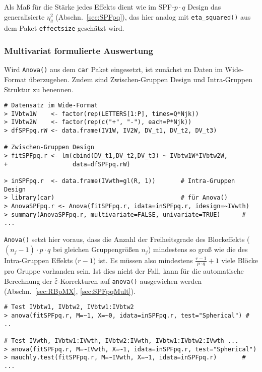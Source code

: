 Als Maß für die Stärke jedes Effekts dient wie im SPF-$p \cdot q$ Design das generalisierte $\eta_{g}^{2}$ (Abschn.\ \ref{sec:SPFpq}), das hier analog mit \lstinline!eta_squared()! aus dem Paket \lstinline!effectsize! geschätzt wird.

\subsubsection{Multivariat formulierte Auswertung}

Wird \lstinline!Anova()! aus dem \lstinline!car! Paket eingesetzt, ist zunächst zu Daten im Wide-Format überzugehen. Zudem sind Zwischen-Gruppen Design und Intra-Gruppen Struktur zu benennen.
\begin{lstlisting}
# Datensatz im Wide-Format
> IVbtw1W    <- factor(rep(LETTERS[1:P], times=Q*Njk))
> IVbtw2W    <- factor(rep(c("+", "-"), each=P*Njk))
> dfSPFpq.rW <- data.frame(IV1W, IV2W, DV_t1, DV_t2, DV_t3)

# Zwischen-Gruppen Design
> fitSPFpq.r <- lm(cbind(DV_t1,DV_t2,DV_t3) ~ IVbtw1W*IVbtw2W,
+                  data=dfSPFpq.rW)

> inSPFpq.r  <- data.frame(IVwth=gl(R, 1))       # Intra-Gruppen Design
> library(car)                                   # für Anova()
> AnovaSPFpq.r <- Anova(fitSPFpq.r, idata=inSPFpq.r, idesign=~IVwth)
> summary(AnovaSPFpq.r, multivariate=FALSE, univariate=TRUE)      # ...
\end{lstlisting}

\lstinline!Anova()! setzt hier voraus, dass die Anzahl der Freiheitsgrade des Blockeffekts ($(n_{j}-1) \cdot p \cdot q$ bei gleichen Gruppengrößen $n_{j}$) mindestens so groß wie die des Intra-Gruppen Effekts ($r-1$) ist. Es müssen also mindestens $\frac{r-1}{p \cdot q} + 1$ viele Blöcke pro Gruppe vorhanden sein. Ist dies nicht der Fall, kann für die automatische Berechnung der $\hat{\varepsilon}$-Korrekturen auf \lstinline!anova()! ausgewichen werden (Abschn.\ \ref{sec:RBpMX}, \ref{sec:SPFpqMult}).
\begin{lstlisting}
# Test IVbtw1, IVbtw2, IVbtw1:IVbtw2
> anova(fitSPFpq.r, M=~1, X=~0, idata=inSPFpq.r, test="Spherical") # ..

# Test IVwth, IVbtw1:IVwth, IVbtw2:IVwth, IVbtw1:IVbtw2:IVwth ...
> anova(fitSPFpq.r, M=~IVwth, X=~1, idata=inSPFpq.r, test="Spherical")
> mauchly.test(fitSPFpq.r, M=~IVwth, X=~1, idata=inSPFpq.r)       # ...
\end{lstlisting}

